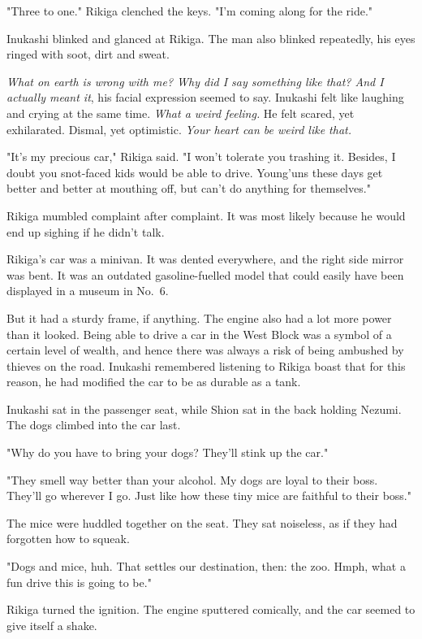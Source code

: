 "Three to one." Rikiga clenched the keys. "I'm coming along for the
ride."

Inukashi blinked and glanced at Rikiga. The man also blinked repeatedly,
his eyes ringed with soot, dirt and sweat.

\emph{What on earth is wrong with me? Why did I say something like that? And I
actually meant it}, his facial expression seemed to say. Inukashi felt
like laughing and crying at the same time. \emph{What a weird feeling.} He felt
scared, yet exhilarated. Dismal, yet optimistic. \emph{Your heart can be weird
like that.}

"It's my precious car," Rikiga said. "I won't tolerate you trashing it.
Besides, I doubt you snot-faced kids would be able to drive. Young'uns
these days get better and better at mouthing off, but can't do anything
for themselves."

Rikiga mumbled complaint after complaint. It was most likely because he
would end up sighing if he didn't talk.

Rikiga's car was a minivan. It was dented everywhere, and the right side
mirror was bent. It was an outdated gasoline-fuelled model that could
easily have been displayed in a museum in No.~6.

But it had a sturdy frame, if anything. The engine also had a lot more
power than it looked. Being able to drive a car in the West Block was a
symbol of a certain level of wealth, and hence there was always a risk
of being ambushed by thieves on the road. Inukashi remembered listening
to Rikiga boast that for this reason, he had modified the car to be as
durable as a tank.

Inukashi sat in the passenger seat, while Shion sat in the back holding
Nezumi. The dogs climbed into the car last.

"Why do you have to bring your dogs? They'll stink up the car."

"They smell way better than your alcohol. My dogs are loyal to their
boss. They'll go wherever I go. Just like how these tiny mice are
faithful to their boss."

The mice were huddled together on the seat. They sat noiseless, as if
they had forgotten how to squeak.

"Dogs and mice, huh. That settles our destination, then: the zoo. Hmph,
what a fun drive this is going to be."

Rikiga turned the ignition. The engine sputtered comically, and the car
seemed to give itself a shake.

